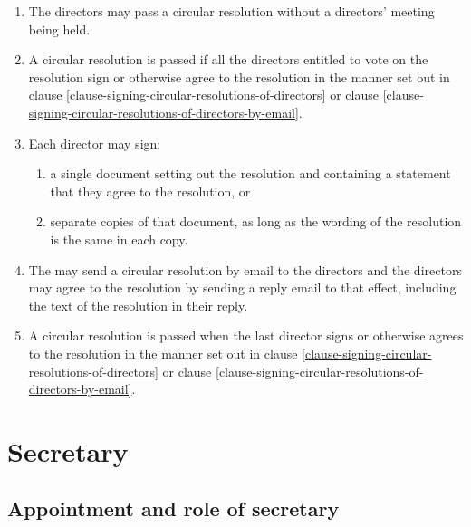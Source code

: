 \documentclass[a4paper]{article}
\let\emph\relax
\begin{document}
\begin{enumerate}
\item The directors may pass a circular resolution without a directors' meeting being held.
\item A circular resolution is passed if all the directors entitled to vote on the resolution sign or otherwise agree to the resolution in the manner set out in clause \ref{clause-signing-circular-resolutions-of-directors} or clause \ref{clause-signing-circular-resolutions-of-directors-by-email}.
\item Each director may sign:\label{clause-signing-circular-resolutions-of-directors}
    \begin{enumerate}
    \item a single document setting out the resolution and containing a statement that they agree to the resolution, or
    \item separate copies of that document, as long as the wording of the resolution is the same in each copy.
    \end{enumerate}
\item The \emph{company} may send a circular resolution by email to the directors and the directors may agree to the resolution by sending a reply email to that effect, including the text of the resolution in their reply.\label{clause-signing-circular-resolutions-of-directors-by-email}
\item A circular resolution is passed when the last director signs or otherwise agrees to the resolution in the manner set out in clause \ref{clause-signing-circular-resolutions-of-directors} or clause \ref{clause-signing-circular-resolutions-of-directors-by-email}.
\end{enumerate}


\section{Secretary}

\subsection{Appointment and role of secretary}
\end{document}
